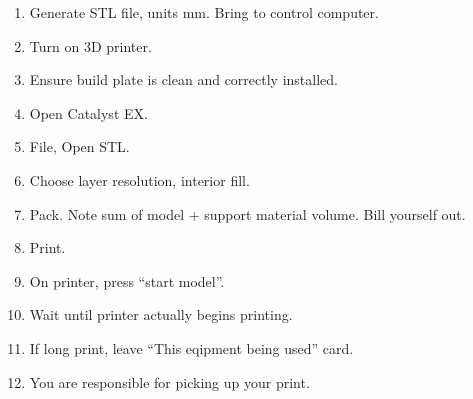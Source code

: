 \documentclass{training}
\begin{document}
\begin{enumerate}
    \item Generate STL file, units mm. Bring to control computer.
    \item Turn on 3D printer.
    \item Ensure build plate is clean and correctly installed.
    \item Open Catalyst EX.
    \item File, Open STL.
    \item Choose layer resolution, interior fill.
    \item Pack. Note sum of model + support material volume. Bill yourself out.
    \item Print.
    \item On printer, press ``start model''.
    \item Wait until printer actually begins printing.
    \item If long print, leave ``This eqipment being used'' card.
    \item You are responsible for picking up your print.
\end{enumerate}


\end{document}
